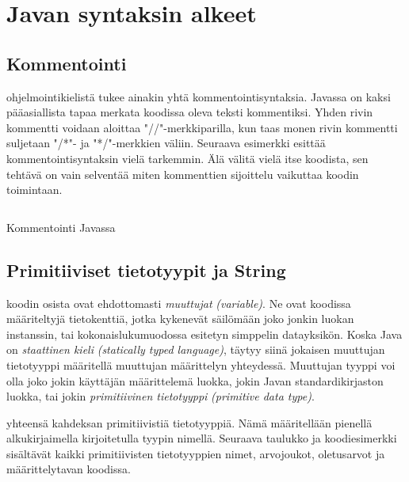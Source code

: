 \documentclass{tufte-book}
\newcommand{\eng}[1]{\textit{(#1)}}
\newcommand{\new}[1]{\textit{\gls{#1}}}
\newcommand{\neweng}[2]{\new{#1} \eng{#2}}
\newcommand{\code}[3]{
\begin{listing}
    \inputminted{java}{OhjelmointiopasEsimerkit/src/#1/#2.java}
    \caption{#3}
    \label{Java-#1-#2}
\end{listing}
}
\begin{document}
\section{Javan syntaksin alkeet}
\label{syntaksin alkeista}

\subsection{Kommentointi}
\label{kommentointi}

 ohjelmointikielistä tukee ainakin yhtä kommentointisyntaksia. Javassa on
kaksi pääasiallista tapaa merkata koodissa oleva teksti kommentiksi. Yhden rivin kommentti voidaan
aloittaa "//"-merkkiparilla, kun taas monen rivin kommentti suljetaan "/*"- ja "*/"-merkkien
väliin. Seuraava esimerkki esittää kommentointisyntaksin vielä tarkemmin. Älä välitä vielä itse
koodista, sen tehtävä on vain selventää miten kommenttien sijoittelu vaikuttaa koodin toimintaan.

\code{week2/basicexamples}{Commenting}{Kommentointi Javassa}

\subsection{Primitiiviset tietotyypit ja String}
\label{tietotyypit}

 koodin osista ovat ehdottomasti \textit{\gls{muuttuja}t}
\eng{variable}. Ne ovat koodissa määriteltyjä tietokenttiä, jotka kykenevät säilömään joko jonkin
luokan instanssin, tai kokonaislukumuodossa esitetyn simppelin datayksikön. Koska Java on 
\neweng{staattinen kieli}{statically typed language}, täytyy siinä jokaisen muuttujan tietotyyppi
määritellä muuttujan määrittelyn yhteydessä. Muuttujan tyyppi voi olla joko jokin käyttäjän
määrittelemä luokka, jokin Javan standardikirjaston luokka, tai jokin \neweng{primitiivinen
tietotyyppi}{primitive data type}.

 yhteensä kahdeksan primitiivistiä tietotyyppiä. Nämä määritellään
pienellä alkukirjaimella kirjoitetulla tyypin nimellä. Seuraava taulukko ja koodiesimerkki
sisältävät kaikki primitiivisten tietotyyppien nimet, arvojoukot, oletusarvot ja määrittelytavan
koodissa.
\end{document}
